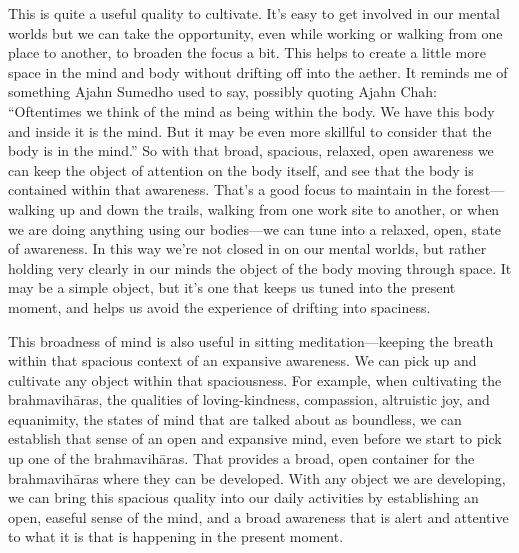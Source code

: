This is quite a useful quality to cultivate. It's easy to get involved
in our mental worlds but we can take the opportunity, even while working
or walking from one place to another, to broaden the focus a bit. This
helps to create a little more space in the mind and body without
drifting off into the aether. It \mbox{reminds} me of something Ajahn
Sumedho used to say, possibly quoting Ajahn Chah: ``Oftentimes we think
of the mind as being within the body. We have this body and inside it is
the mind. But it may be even more skillful to consider that the body is
in the mind.'' So with that broad, spacious, relaxed, open awareness we
can keep the object of attention on the body itself, and see that the
body is contained within that awareness. That's a good focus to maintain
in the forest---walking up and down the trails, walking from one work
site to another, or when we are doing anything using our bodies---we can
tune into a relaxed, open, state of awareness. In this way we're not
closed in on our mental worlds, but rather holding very clearly in our
minds the object of the body moving through space. It may be a simple
object, but it's one that keeps us tuned into the present moment, and
helps us avoid the experience of drifting into spaciness.

This broadness of mind is also useful in sitting meditation---keeping 
the breath within that spacious context of an expansive awareness. We 
can pick up and cultivate any object within that spaciousness. For 
example, when cultivating the brahmavihāras, the qualities of 
loving-kindness, compassion, altruistic joy, and equanimity, the states 
of mind that are talked about as boundless, we can establish that sense 
of an open and expansive mind, even before we start to pick up one of 
the brahmavihāras. That provides a broad, open container for the 
brahmavihāras where they can be developed. With any object we are 
developing, we can bring this spacious quality into our daily 
activities by establishing an open, easeful sense of the mind, and a 
broad awareness that is alert and attentive to what it is that is 
happening in the present moment.


